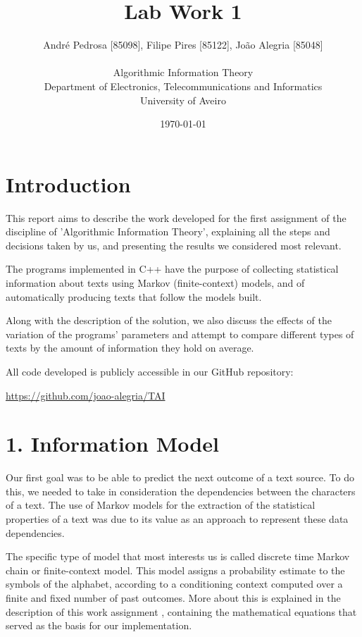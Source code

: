 \documentclass[12pt]{article}
\title{Lab Work 1}
\author
{André Pedrosa [85098], Filipe Pires [85122], João Alegria [85048]\\
\\
Algorithmic Information Theory\\
\normalsize{Department of Electronics, Telecommunications and Informatics}\\
\normalsize{University of Aveiro}\\
}
\date{\today{}}
\begin{document}
 

\baselineskip18pt

\maketitle 

\section*{Introduction}

This report aims to describe the work developed for the first assignment
of the discipline of 'Algorithmic Information Theory', explaining all the 
steps and decisions taken by us, and presenting the results we considered 
most relevant.

The programs implemented in C++ have the purpose of collecting statistical
information about texts using Markov (finite-context) models, and of 
automatically producing texts that follow the models built.

Along with the description of the solution, we also discuss the effects
of the variation of the programs' parameters and attempt to compare 
different types of texts by the amount of information they hold on average.

All code developed is publicly accessible in our GitHub repository:

\url{https://github.com/joao-alegria/TAI}
\newpage

\section*{1. Information Model}

Our first goal was to be able to predict the next outcome of a text source.
To do this, we needed to take in consideration the dependencies between 
the characters of a text.
The use of Markov models for the extraction of the statistical properties of a
text was due to its value as an approach to represent these data dependencies.

The specific type of model that most interests us is called discrete time
Markov chain or finite-context model.
This model assigns a probability estimate to the symbols of the alphabet, 
according to a conditioning context computed over a finite and fixed number
of past outcomes. 
More about this is explained in the description of this work assignment 
\cite{trab1}, containing the mathematical equations that served as the basis 
for our implementation.
\end{document}
